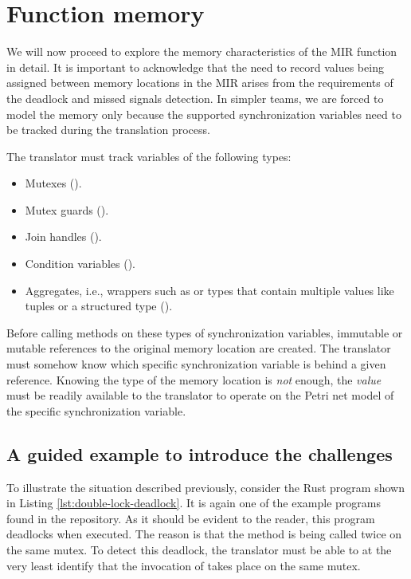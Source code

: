 \section{Function memory}

We will now proceed to explore the memory characteristics
of the \acrshort{MIR} function in detail.
It is important to acknowledge that
the need to record values being assigned between memory locations in the \acrshort{MIR} arises
from the requirements of the deadlock and missed signals detection.
In simpler teams, we are forced to model the memory only
because the supported synchronization variables need to be tracked
during the translation process.

The translator must track variables of the following types:

\begin{itemize}
  \item Mutexes ().
  \item Mutex guards ().
  \item Join handles ().
  \item Condition variables ().
  \item Aggregates, i.e., wrappers such as  or
        types that contain multiple values like tuples or a structured type ().
\end{itemize}

Before calling methods on these types of synchronization variables,
immutable or mutable references to the original memory location are created.
The translator must somehow know
which specific synchronization variable is behind a given reference.
Knowing the type of the memory location is \emph{not} enough,
the \emph{value} must be readily available to the translator
to operate on the Petri net model of the specific synchronization variable.

\subsection{A guided example to introduce the challenges}

To illustrate the situation described previously, consider the Rust program
shown in Listing \ref{lst:double-lock-deadlock}.
It is again one of the example programs found in the repository.
As it should be evident to the reader, this program deadlocks when executed.
The reason is that the  method is
being called twice on the same mutex.
To detect this deadlock, the translator must be able to at the very least
identify that the invocation of  takes place on the same mutex.


